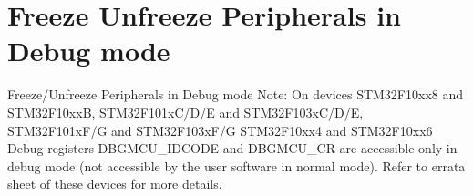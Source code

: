 \hypertarget{group___d_b_g_m_c_u___freeze___unfreeze}{}\section{Freeze Unfreeze Peripherals in Debug mode}
\label{group___d_b_g_m_c_u___freeze___unfreeze}


Freeze/\+Unfreeze Peripherals in Debug mode Note\+: On devices S\+T\+M32\+F10xx8 and S\+T\+M32\+F10xxB, S\+T\+M32\+F101x\+C/\+D/E and S\+T\+M32\+F103x\+C/\+D/E, S\+T\+M32\+F101x\+F/G and S\+T\+M32\+F103x\+F/G S\+T\+M32\+F10xx4 and S\+T\+M32\+F10xx6 Debug registers D\+B\+G\+M\+C\+U\+\_\+\+I\+D\+C\+O\+DE and D\+B\+G\+M\+C\+U\+\_\+\+CR are accessible only in debug mode (not accessible by the user software in normal mode). Refer to errata sheet of these devices for more details.  


